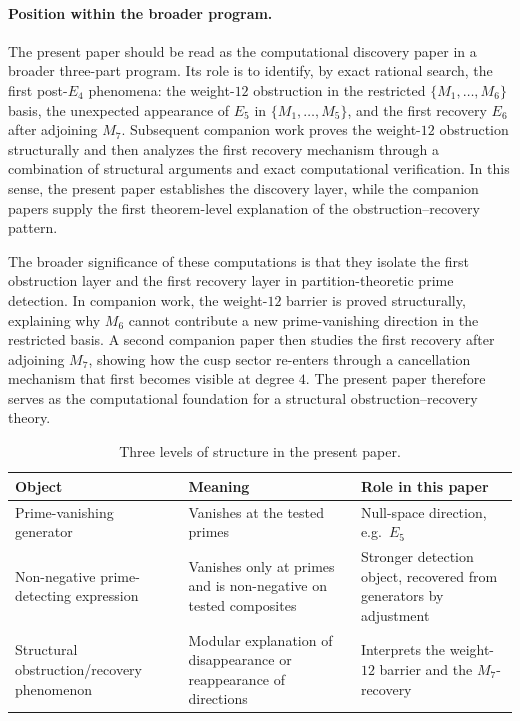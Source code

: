 

\paragraph{Position within the broader program.}
The present paper should be read as the computational discovery paper in a broader three-part program. Its role is to identify, by exact rational search, the first post-$E_4$ phenomena: the weight-$12$ obstruction in the restricted $\{M_1,\dots,M_6\}$ basis, the unexpected appearance of $E_5$ in $\{M_1,\dots,M_5\}$, and the first recovery $E_6$ after adjoining $M_7$. Subsequent companion work proves the weight-$12$ obstruction structurally and then analyzes the first recovery mechanism through a combination of structural arguments and exact computational verification. In this sense, the present paper establishes the discovery layer, while the companion papers supply the first theorem-level explanation of the obstruction--recovery pattern.

The broader significance of these computations is that they isolate the first obstruction layer and the first recovery layer in partition-theoretic prime detection. In companion work, the weight-$12$ barrier is proved structurally, explaining why $M_6$ cannot contribute a new prime-vanishing direction in the restricted basis. A second companion paper then studies the first recovery after adjoining $M_7$, showing how the cusp sector re-enters through a cancellation mechanism that first becomes visible at degree $4$. The present paper therefore serves as the computational foundation for a structural obstruction--recovery theory.

\begin{table}[htbp]
\centering
\caption{Three levels of structure in the present paper.}
\label{tab:three-levels}
\begin{tabular}{@{}lll@{}}
\toprule
Object & Meaning & Role in this paper \\
\midrule
Prime-vanishing generator & Vanishes at the tested primes & Null-space direction, e.g.\ $E_5$ \\
Non-negative prime-detecting expression & Vanishes only at primes and is non-negative on tested composites & Stronger detection object, recovered from generators by adjustment \\
Structural obstruction/recovery phenomenon & Modular explanation of disappearance or reappearance of directions & Interprets the weight-$12$ barrier and the $M_7$-recovery \\
\bottomrule
\end{tabular}
\end{table}

